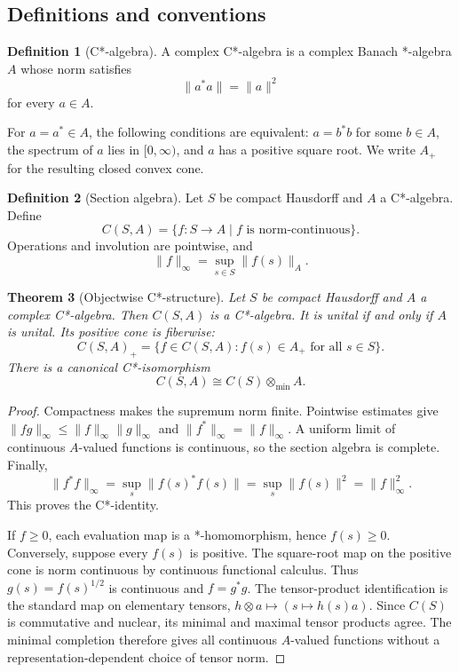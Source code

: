 \documentclass[12pt]{article}
\newtheorem{theorem}{Theorem}[section]
\theoremstyle{definition}
\newtheorem{definition}[theorem]{Definition}
\theoremstyle{remark}
\begin{document}
\subsection{Definitions and conventions}

\begin{definition}[C*-algebra]
A complex C*-algebra is a complex Banach *-algebra $A$ whose norm satisfies
\[
\|a^*a\|=\|a\|^2
\]
for every $a\in A$.
\end{definition}

For $a=a^*\in A$, the following conditions are equivalent: $a=b^*b$ for some
$b\in A$, the spectrum of $a$ lies in $[0,\infty)$, and $a$ has a positive square
root.  We write $A_+$ for the resulting closed convex cone.

\begin{definition}[Section algebra]
Let $S$ be compact Hausdorff and $A$ a C*-algebra.  Define
\[
C(S,A)=\{f:S\to A\mid f\text{ is norm-continuous}\}.
\]
Operations and involution are pointwise, and
\[
\|f\|_\infty=\sup_{s\in S}\|f(s)\|_A.
\]
\end{definition}

\begin{theorem}[Objectwise C*-structure]\label{thm:objectwise}
Let $S$ be compact Hausdorff and $A$ a complex C*-algebra.  Then $C(S,A)$ is a
C*-algebra.  It is unital if and only if $A$ is unital.  Its positive cone is
fiberwise:
\[
C(S,A)_+
=
\{f\in C(S,A):f(s)\in A_+\text{ for all }s\in S\}.
\]
There is a canonical C*-isomorphism
\[
C(S,A)\cong C(S)\otimes_{\min}A.
\]
\end{theorem}

\begin{proof}
Compactness makes the supremum norm finite.  Pointwise estimates give
$\|fg\|_\infty\leq\|f\|_\infty\|g\|_\infty$ and
$\|f^*\|_\infty=\|f\|_\infty$.  A uniform limit of continuous $A$-valued
functions is continuous, so the section algebra is complete.  Finally,
\[
\|f^*f\|_\infty
=\sup_s\|f(s)^*f(s)\|
=\sup_s\|f(s)\|^2
=\|f\|_\infty^2.
\]
This proves the C*-identity.

If $f\geq0$, each evaluation map is a *-homomorphism, hence $f(s)\geq0$.  Conversely,
suppose every $f(s)$ is positive.  The square-root map on the positive cone is norm
continuous by continuous functional calculus.  Thus $g(s)=f(s)^{1/2}$ is continuous
and $f=g^*g$.  The tensor-product identification is the standard map on elementary
tensors, $h\otimes a\mapsto(s\mapsto h(s)a)$.  Since $C(S)$ is commutative and
nuclear, its minimal and maximal tensor products agree.  The minimal completion
therefore gives all continuous $A$-valued functions without a representation-dependent
choice of tensor norm.
\end{proof}
\end{document}
